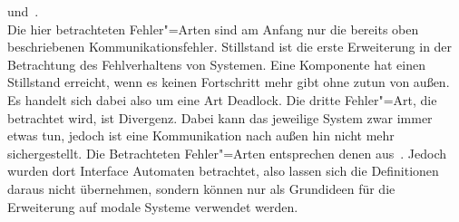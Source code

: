 und~\cite{Schinko2016BA}.\\
Die hier betrachteten Fehler"=Arten sind am Anfang nur die bereits oben
beschriebenen Kommunikationsfehler. Stillstand ist die erste Erweiterung in der
Betrachtung des Fehlverhaltens von Systemen. Eine Komponente hat einen
Stillstand erreicht, wenn es keinen Fortschritt mehr gibt ohne zutun von außen.
Es handelt sich dabei also um eine Art Deadlock. Die dritte Fehler"=Art, die
betrachtet wird, ist Divergenz. Dabei kann das jeweilige System zwar immer
etwas tun, jedoch ist eine Kommunikation nach außen hin nicht mehr
sichergestellt. Die Betrachteten Fehler"=Arten entsprechen denen
aus~\cite{Schinko2016BA}. Jedoch wurden dort Interface Automaten betrachtet,
also lassen sich die Definitionen daraus nicht übernehmen, sondern können nur
als Grundideen für die Erweiterung auf modale Systeme verwendet werden.
